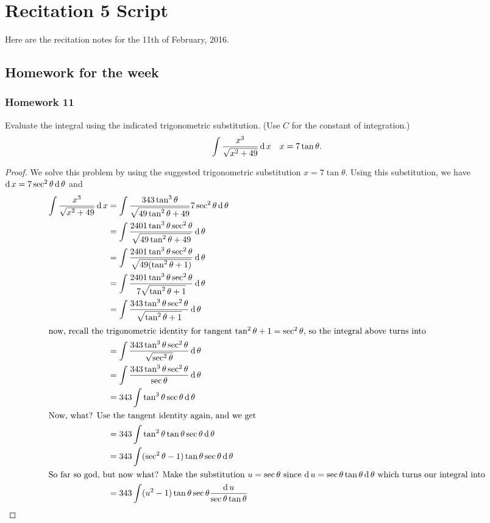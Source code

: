 \chapter{Recitation 5 Script}
Here are the recitation notes for the 11th of February, 2016.
\section{Homework for the week}

\subsection{Homework 11}
\begin{problem}[WebAssign, HW 11, \#1]
Evaluate the integral using the indicated trigonometric substitution. (Use
$C$ for the constant of integration.)
\[
\int\frac{x^3}{\sqrt{x^2+49}}\operatorname{d} x\quad x=7\tan\theta.
\]
\end{problem}
\begin{proof}
We solve this problem by using the suggested trigonometric substitution
$x=7\tan\theta$. Using this substitution, we have $\operatorname{d}
x=7\sec^2\theta\operatorname{d}\theta$ and
\begingroup
\allowdisplaybreaks
\begin{align*}
\int\frac{x^3}{\sqrt{x^2+49}}\operatorname{d}
  x&=\int\frac{343\tan^3\theta}{\sqrt{49\tan^2\theta+49}}7\sec^2\theta\operatorname{d}\theta\\
   &=\int\frac{2401\tan^3\theta\sec^2\theta}{\sqrt{49\tan^2\theta+49}}\operatorname{d}\theta\\
   &=\int\frac{2401\tan^3\theta\sec^2\theta}{\sqrt{49(\tan^2\theta+1)}}\operatorname{d}\theta\\
   &=\int\frac{2401\tan^3\theta\sec^2\theta}{7\sqrt{\tan^2\theta+1}}\operatorname{d}\theta\\
   &=\int\frac{343\tan^3\theta\sec^2\theta}{\sqrt{\tan^2\theta+1}}\operatorname{d}\theta\\
\intertext{now, recall the trigonometric identity for tangent
  $\tan^2\theta+1=\sec^2\theta$, so the integral above turns into}
   &=\int\frac{343\tan^3\theta\sec^2\theta}{\sqrt{\sec^2\theta}}\operatorname{d}\theta\\
   &=\int\frac{343\tan^3\theta\sec^2\theta}{\sec\theta}\operatorname{d}\theta\\
   &=343\int\tan^3\theta\sec\theta\operatorname{d}\theta\\
\intertext{Now, what? Use the tangent identity again, and we get}
   &=343\int\tan^2\theta\tan\theta\sec\theta\operatorname{d}\theta\\
   &=343\int(\sec^2\theta-1)\tan\theta\sec\theta\operatorname{d}\theta\\
\intertext{So far so god, but now what? Make the substitution
  $u=\sec\theta$ since $\operatorname{d} u=\sec\theta\tan\theta\operatorname{d}\theta$ which
  turns our integral into}
   &=343\int(u^2-1)\tan\theta\sec\theta\frac{\operatorname{d} u}{\sec\theta\tan\theta}
\end{align*}
\endgroup
\end{proof}

